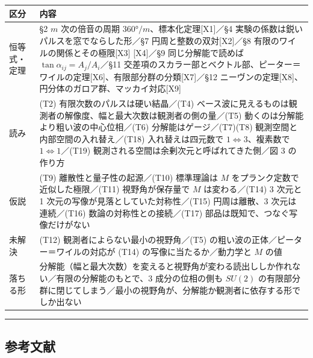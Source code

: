 \documentclass[
  a4paper,
]{ltjsarticle}
\newcounter{none} %
\begin{document}
{\def\LTcaptype{none} %
\begin{longtable}[]{@{}
  >{\raggedright\arraybackslash}p{}
  >{\raggedright\arraybackslash}p{}@{}}
\toprule\noalign{}
\begin{minipage}[b]{\linewidth}\raggedright
区分
\end{minipage} & \begin{minipage}[b]{\linewidth}\raggedright
内容
\end{minipage} \\
\midrule\noalign{}
\endhead
\bottomrule\noalign{}
\endlastfoot
恒等式・定理 & §2 \(m\) 次の倍音の周期
\(360°/m\)、標本化定理{[}X1{]}／§4
実験の係数は鋭いパルスを窓でならした形／§7 円周と整数の双対{[}X2{]}／§8
有限のワイルの関係とその極限{[}X3{]} {[}X4{]}／§9 同じ分解能で読めば
\(\tan\alpha_{ij}=A_j/A_i\)／§11
交差項のスカラー部とベクトル部、ピーター＝ワイルの定理{[}X6{]}、有限部分群の分類{[}X7{]}／§12
ニーヴンの定理{[}X8{]}、円分体のガロア群、マッカイ対応{[}X9{]} \\
読み & (T2) 有限次数のパルスは硬い結晶／(T4)
ベース波に見えるものは観測者の解像度、幅と最大次数は観測者の側の量／(T5)
動くのは分解能より粗い波の中心位相／(T6) 分解能はゲージ／(T7)(T8)
観測空間と内部空間の入れ替え／(T18) 入れ替えは四元数で
\(1\Leftrightarrow3\)、複素数で \(1\Leftrightarrow1\)／(T19)
観測される空間は余剰次元と呼ばれてきた側／図 3 の作り方 \\
仮説 & (T9) 離散性と量子性の起源／(T10) 標準理論は \(M\)
をプランク定数で近似した極限／(T11) 視野角が保存量で \(M\)
は変わる／(T14) 3 次元と 1 次元の写像が見落としていた対称性／(T15)
円周は離散、3 次元は連続／(T16) 数論の対称性との接続／(T17)
部品は既知で、つなぐ写像だけがない \\
未解決 & (T12) 観測者によらない最小の視野角／(T5)
の粗い波の正体／ピーター＝ワイルの対応が (T14)
の写像に当たるか／動力学と \(M\) の値 \\
落ちる形 &
分解能（幅と最大次数）を変えると視野角が変わる読出ししか作れない／有限の分解能のもとで、3
成分の位相の側も \(SU(2)\)
の有限部分群に閉じてしまう／最小の視野角が、分解能か観測者に依存する形でしか出ない \\
\end{longtable}
}

\begin{center}\rule{0.5\linewidth}{0.5pt}\end{center}

\subsection{参考文献}\label{ux53c2ux8003ux6587ux732e}
\end{document}
